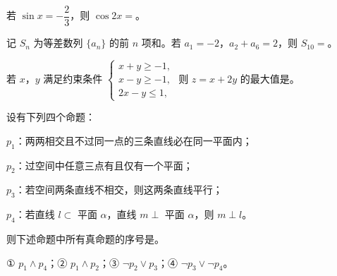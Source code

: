 \begin{question}
若 $\sin x=-\dfrac23$，则 $\cos2x=$\gkblank{}。

\end{question}
\begin{question}
记 $S_n$ 为等差数列 $\{a_n\}$ 的前 $n$ 项和。若 $a_1=-2$，$a_2+a_6=2$，则 $S_{10}=$\gkblank{}。

\end{question}
\begin{question}
若 $x$，$y$ 满足约束条件 $\begin{cases}x+y\geqslant-1,\\x-y\geqslant-1,\\2x-y\leqslant1,\end{cases}$ 则 $z=x+2y$ 的最大值是\gkblank{}。

\end{question}
\begin{question}
设有下列四个命题：

$p_1$：两两相交且不过同一点的三条直线必在同一平面内；

$p_2$：过空间中任意三点有且仅有一个平面；

$p_3$：若空间两条直线不相交，则这两条直线平行；

$p_4$：若直线 $l\subset$ 平面 $\alpha$，直线 $m\perp$ 平面 $\alpha$，则 $m\perp l$。

则下述命题中所有真命题的序号是\gkblank{}。

① $p_1\wedge p_4$；② $p_1\wedge p_2$；③ $\neg p_2\vee p_3$；④ $\neg p_3\vee\neg p_4$。

\end{question}

